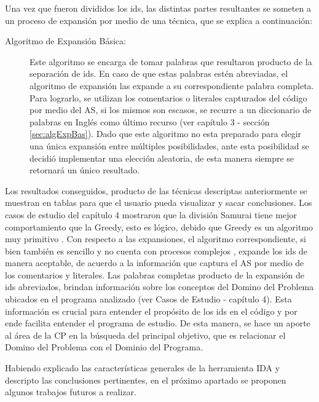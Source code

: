 Una vez que fueron divididos los ids, las distintas partes resultantes se someten a un proceso de expansión por medio de una técnica, que se explica a continuación:
\pagebreak
\begin{description}
\item[Algoritmo de Expansión Básica:] Este algoritmo se encarga de tomar palabras que resultaron producto de la separación de ids. En caso de que estas palabras estén abreviadas, el algoritmo de expansión las expande a su correspondiente palabra completa. Para lograrlo, se utilizan los comentarios o literales capturados del código por medio del AS, si los mismos son escasos, se recurre a un diccionario de palabras en Inglés como último recurso (ver capítulo 3 - sección \ref{sec:algExpBas}). Dado que este algoritmo no esta preparado para elegir una única expansión entre múltiples posibilidades, ante esta posibilidad se decidió implementar una elección aleatoria, de esta manera siempre se retornará un único resultado.

\end{description}

Los resultados conseguidos, producto de las técnicas descriptas anteriormente se muestran en tablas para que el usuario pueda visualizar y sacar conclusiones. Los casos de estudio del capítulo 4 mostraron que la división Samurai tiene mejor comportamiento que la Greedy, esto es lógico, debido que Greedy es un algoritmo muy primitivo \cite{DLFB06,FBL06,HDD06}. Con respecto a las expansiones, el algoritmo correspondiente, si bien también es sencillo y no cuenta con procesos complejos \cite{LFBEX07}, expande los ids de manera aceptable, de acuerdo a la información que captura el AS por medio de los comentarios y literales.
Las palabras completas producto de la expansión de ids abreviados, brindan información sobre los conceptos del Domino del Problema ubicados en el programa analizado (ver Casos de Estudio - capítulo 4). Esta información es crucial para entender el propósito de los ids en el código y por ende facilita entender el programa de estudio.
De esta manera, se hace un aporte al área de la CP en la búsqueda del principal objetivo, que es relacionar el Domino del Problema con el Dominio del Programa.

Habiendo explicado las características generales de la herramienta IDA y descripto las conclusiones pertinentes, en el próximo apartado se proponen algunos trabajos futuros a realizar.


